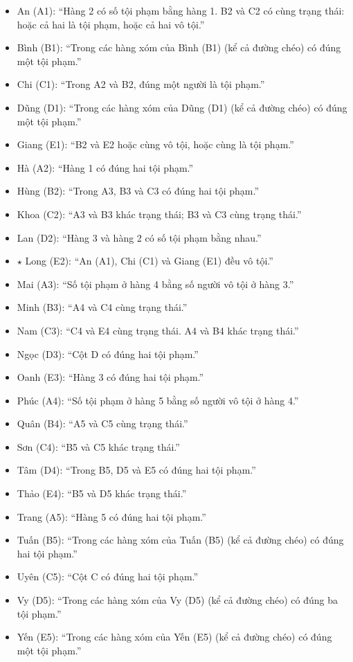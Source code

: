 \begin{itemize}\setlength{\itemsep}{0pt}\small
  \item An (A1): ``Hàng 2 có số tội phạm bằng hàng 1. B2 và C2 có cùng trạng thái: hoặc cả hai là tội phạm, hoặc cả hai vô tội.''
  \item Bình (B1): ``Trong các hàng xóm của Bình (B1) (kể cả đường chéo) có đúng một tội phạm.''
  \item Chi (C1): ``Trong A2 và B2, đúng một người là tội phạm.''
  \item Dũng (D1): ``Trong các hàng xóm của Dũng (D1) (kể cả đường chéo) có đúng một tội phạm.''
  \item Giang (E1): ``B2 và E2 hoặc cùng vô tội, hoặc cùng là tội phạm.''
  \item Hà (A2): ``Hàng 1 có đúng hai tội phạm.''
  \item Hùng (B2): ``Trong A3, B3 và C3 có đúng hai tội phạm.''
  \item Khoa (C2): ``A3 và B3 khác trạng thái; B3 và C3 cùng trạng thái.''
  \item Lan (D2): ``Hàng 3 và hàng 2 có số tội phạm bằng nhau.''
  \item $\star$ Long (E2): ``An (A1), Chi (C1) và Giang (E1) đều vô tội.''
  \item Mai (A3): ``Số tội phạm ở hàng 4 bằng số người vô tội ở hàng 3.''
  \item Minh (B3): ``A4 và C4 cùng trạng thái.''
  \item Nam (C3): ``C4 và E4 cùng trạng thái. A4 và B4 khác trạng thái.''
  \item Ngọc (D3): ``Cột D có đúng hai tội phạm.''
  \item Oanh (E3): ``Hàng 3 có đúng hai tội phạm.''
  \item Phúc (A4): ``Số tội phạm ở hàng 5 bằng số người vô tội ở hàng 4.''
  \item Quân (B4): ``A5 và C5 cùng trạng thái.''
  \item Sơn (C4): ``B5 và C5 khác trạng thái.''
  \item Tâm (D4): ``Trong B5, D5 và E5 có đúng hai tội phạm.''
  \item Thảo (E4): ``B5 và D5 khác trạng thái.''
  \item Trang (A5): ``Hàng 5 có đúng hai tội phạm.''
  \item Tuấn (B5): ``Trong các hàng xóm của Tuấn (B5) (kể cả đường chéo) có đúng hai tội phạm.''
  \item Uyên (C5): ``Cột C có đúng hai tội phạm.''
  \item Vy (D5): ``Trong các hàng xóm của Vy (D5) (kể cả đường chéo) có đúng ba tội phạm.''
  \item Yến (E5): ``Trong các hàng xóm của Yến (E5) (kể cả đường chéo) có đúng một tội phạm.''
\end{itemize}

